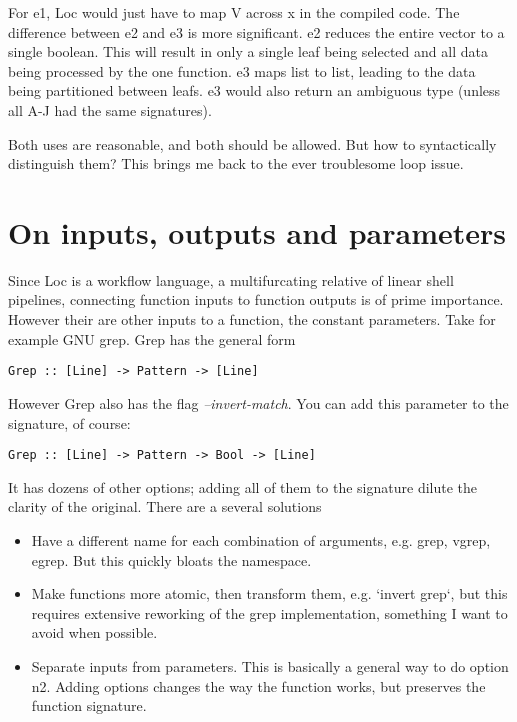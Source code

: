 \documentclass[12pt]{article}
\begin{document}
For e1, Loc would just have to map V across x in the compiled code. The
difference between e2 and e3 is more significant. e2 reduces the entire vector
to a single boolean. This will result in only a single leaf being selected and
all data being processed by the one function. e3 maps list to list, leading to
the data being partitioned between leafs. e3 would also return an ambiguous
type (unless all A-J had the same signatures).

Both uses are reasonable, and both should be allowed. But how to syntactically
distinguish them? This brings me back to the ever troublesome loop issue.

\section{On inputs, outputs and parameters}

Since Loc is a workflow language, a multifurcating relative of linear shell
pipelines, connecting function inputs to function outputs is of prime
importance. However their are other inputs to a function, the constant
parameters. Take for example GNU grep. Grep has the general form

\begin{verbatim}
Grep :: [Line] -> Pattern -> [Line]
\end{verbatim}

However Grep also has the flag {\it --invert-match}. You can add this parameter to the signature, of course:

\begin{verbatim}
Grep :: [Line] -> Pattern -> Bool -> [Line]
\end{verbatim}

It has dozens of other options; adding all of them to the signature dilute the
clarity of the original. There are a several solutions

\begin{itemize}
 \item Have a different name for each combination of arguments, e.g. grep, vgrep,
    egrep. But this quickly bloats the namespace.
 \item Make functions more atomic, then transform them, e.g. `invert grep`, but
    this requires extensive reworking of the grep implementation, something
    I want to avoid when possible. 
 \item Separate inputs from parameters. This is basically a general way to do
    option n2. Adding options changes the way the function works, but preserves
    the function signature.
\end{itemize}
\end{document}
